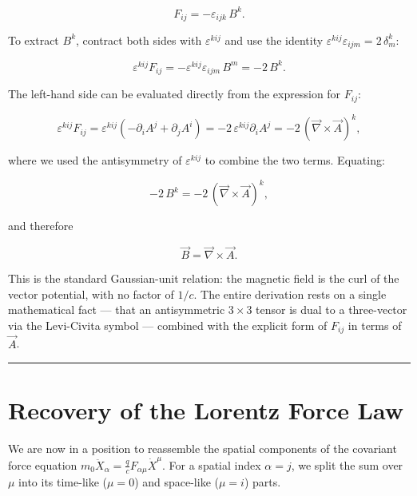 \begin{equation}
F_{ij} = -\varepsilon_{ijk}\,B^k.
\end{equation}

To extract $B^k$, contract both sides with $\varepsilon^{kij}$ and use the identity $\varepsilon^{kij}\varepsilon_{ijm} = 2\,\delta^k_m$:

\begin{equation}
\varepsilon^{kij}F_{ij} = -\varepsilon^{kij}\varepsilon_{ijm}\,B^m = -2\,B^k.
\end{equation}

The left-hand side can be evaluated directly from the expression for $F_{ij}$:

\begin{equation}
\varepsilon^{kij}F_{ij} = \varepsilon^{kij}(-\partial_i A^j + \partial_j A^i) = -2\,\varepsilon^{kij}\partial_i A^j = -2\,(\vec{\nabla}\times\vec{A})^k,
\end{equation}

where we used the antisymmetry of $\varepsilon^{kij}$ to combine the two terms. Equating:

\begin{equation}
-2\,B^k = -2\,(\vec{\nabla}\times\vec{A})^k,
\end{equation}

and therefore

\begin{equation}
\boxed{\vec{B} = \vec{\nabla}\times\vec{A}.}
\end{equation}

This is the standard Gaussian-unit relation: the magnetic field is the curl of the vector potential, with no factor of $1/c$. The entire derivation rests on a single mathematical fact --- that an antisymmetric $3\times 3$ tensor is dual to a three-vector via the Levi-Civita symbol --- combined with the explicit form of $F_{ij}$ in terms of $\vec{A}$.

\hrule
\vspace{1em}

\section{Recovery of the Lorentz Force Law}

We are now in a position to reassemble the spatial components of the covariant force equation $m_0\ddot{X}_\alpha = \frac{q}{c}F_{\alpha\mu}\dot{X}^\mu$. For a spatial index $\alpha = j$, we split the sum over $\mu$ into its time-like ($\mu = 0$) and space-like ($\mu = i$) parts.

